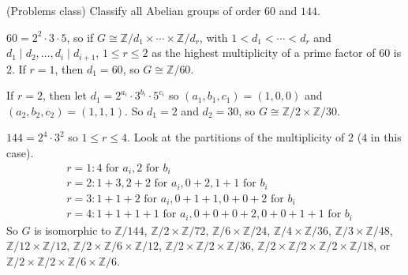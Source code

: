 \begin{example}
	(Problems class) Classify all Abelian groups of order $60$ and $144$.

	$60 = 2^2 \cdot 3 \cdot 5$, so if $G \cong \mathbb{Z} / d_1 \times \cdots \times \mathbb{Z} / d_r$, with $1 < d_1 < \cdots < d_r$ and $d_1 \mid d_2, \dots, d_i \mid d_{i + 1}$, $1 \le r \le 2$ as the highest multiplicity of a prime factor of $60$ is $2$. If $r = 1$, then $d_1 = 60$, so $G \cong \mathbb{Z} / 60$.

	If $r = 2$, then let $d_1 = 2^{a_i} \cdot 3^{b_i} \cdot 5^{c_i}$ so $(a_1, b_1, c_1) = (1, 0, 0)$ and $(a_2, b_2, c_2) = (1, 1, 1)$. So $d_1 = 2$ and $d_2 = 30$, so $G \cong \mathbb{Z} / 2 \times \mathbb{Z} / 30$.

	$144 = 2^4 \cdot 3^2$ so $1 \le r \le 4$. Look at the partitions of the multiplicity of $2$ ($4$ in this case).
	\[
		\begin{aligned}
			& r = 1: 4 \text{ for } a_i, 2 \text{ for } b_i \\
			& r = 2: 1 + 3, 2 + 2 \text{ for } a_i, 0 + 2, 1 + 1 \text{ for } b_i  \\
			& r = 3: 1 + 1 + 2 \text{ for } a_i, 0 + 1 + 1, 0 + 0 + 2 \text{ for } b_i \\
			& r = 4: 1 + 1 + 1 + 1 \text{ for } a_i, 0 + 0 + 0 + 2, 0 + 0 + 1 + 1 \text{ for } b_i
		\end{aligned}
	\]
	So $G$ is isomorphic to $\mathbb{Z} / 144$, $\mathbb{Z} / 2 \times \mathbb{Z} / 72$, $\mathbb{Z} / 6 \times \mathbb{Z} / 24$, $\mathbb{Z} / 4 \times \mathbb{Z} / 36$, $\mathbb{Z} / 3 \times \mathbb{Z} / 48$, $\mathbb{Z} / 12 \times \mathbb{Z} / 12$, $\mathbb{Z} / 2 \times \mathbb{Z} / 6 \times \mathbb{Z} / 12$, $\mathbb{Z} / 2 \times \mathbb{Z} / 2 \times \mathbb{Z} / 36$, $\mathbb{Z} / 2 \times \mathbb{Z} / 2 \times \mathbb{Z} / 2 \times \mathbb{Z} / 18$, or $\mathbb{Z} / 2 \times \mathbb{Z} / 2 \times \mathbb{Z} / 6 \times \mathbb{Z} / 6$.
\end{example}

